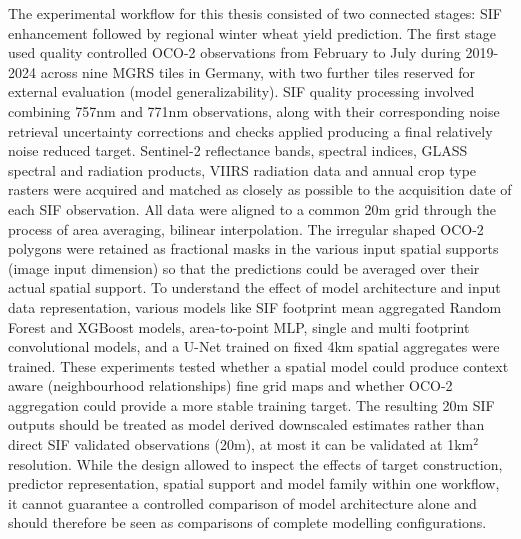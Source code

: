 The experimental workflow for this thesis consisted of two connected stages: SIF enhancement followed by regional winter wheat yield prediction. The first stage used quality controlled OCO-2 observations from February to July during 2019-2024 across nine MGRS tiles in Germany, with two further tiles reserved for external evaluation (model generalizability). SIF quality processing involved combining 757nm and 771nm observations, along with their corresponding noise retrieval uncertainty corrections and checks applied producing a final relatively noise reduced target. Sentinel-2 reflectance bands, spectral indices, GLASS spectral and radiation products, VIIRS radiation data and annual crop type rasters were acquired and matched as closely as possible to the acquisition date of each SIF observation. All data were aligned to a common 20m grid through the process of area averaging, bilinear interpolation. The irregular shaped OCO-2 polygons were retained as fractional masks in the various input spatial supports (image input dimension) so that the predictions could be averaged over their actual spatial support. To understand the effect of model architecture and input data representation, various models like SIF footprint mean aggregated Random Forest and XGBoost models, area-to-point MLP, single and multi footprint convolutional models, and a U-Net trained on fixed 4km spatial aggregates were trained.  These experiments tested whether a spatial model could produce context aware (neighbourhood relationships) fine grid maps and whether OCO-2 aggregation could provide a more stable training target. The resulting 20m SIF outputs should be treated as model derived downscaled estimates rather than direct SIF validated observations (20m), at most it can be validated at 1km$^2$ resolution. While the design allowed to inspect the effects of target construction, predictor representation, spatial support and model family within one workflow, it cannot guarantee a controlled comparison of model architecture alone and should therefore be seen as comparisons of complete modelling configurations. 

